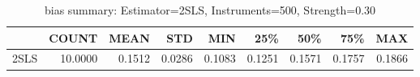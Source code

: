 \begin{table}[ht]
\centering
\caption{bias summary: Estimator=2SLS, Instruments=500, Strength=0.30}
\begin{tabular}{lrrrrrrrr}
\toprule
 & COUNT & MEAN & STD & MIN & 25\% & 50\% & 75\% & MAX \\
\midrule
2SLS & 10.0000 & 0.1512 & 0.0286 & 0.1083 & 0.1251 & 0.1571 & 0.1757 & 0.1866 \\
\bottomrule
\end{tabular}
\end{table}
